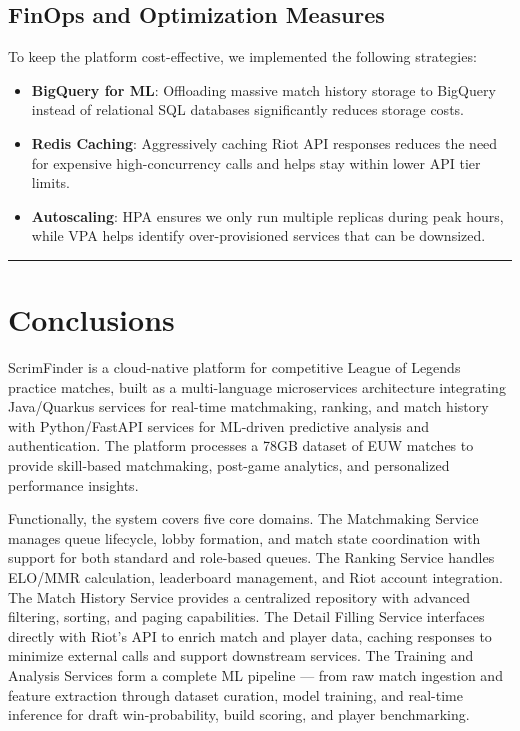 \documentclass[11pt,a4paper]{article}
\newcommand{\bff}[1]{\textbf{#1}}
\begin{document}
 \subsection{FinOps and Optimization Measures}
 To keep the platform cost-effective, we implemented the following strategies:
 \begin{itemize}
  \item \bff{BigQuery for ML}: Offloading massive match history storage to BigQuery instead of relational SQL databases significantly reduces storage costs.
  \item \bff{Redis Caching}: Aggressively caching Riot API responses reduces the need for expensive high-concurrency calls and helps stay within lower API tier limits.
  \item \bff{Autoscaling}: HPA ensures we only run multiple replicas during peak hours, while VPA helps identify over-provisioned services that can be downsized.
 \end{itemize}

 \vspace{1cm}
 \hrule
 \vspace{1cm}

 \section{Conclusions}

 ScrimFinder is a cloud-native platform for competitive League of Legends practice matches, built as a multi-language microservices architecture integrating Java/Quarkus services for real-time matchmaking, ranking, and match history with Python/FastAPI services for ML-driven predictive analysis and authentication. The platform processes a 78GB dataset of EUW matches to provide skill-based matchmaking, post-game analytics, and personalized performance insights.

 Functionally, the system covers five core domains. The Matchmaking Service manages queue lifecycle, lobby formation, and match state coordination with support for both standard and role-based queues. The Ranking Service handles ELO/MMR calculation, leaderboard management, and Riot account integration. The Match History Service provides a centralized repository with advanced filtering, sorting, and paging capabilities. The Detail Filling Service interfaces directly with Riot's API to enrich match and player data, caching responses to minimize external calls and support downstream services. The Training and Analysis Services form a complete ML pipeline --- from raw match ingestion and feature extraction through dataset curation, model training, and real-time inference for draft win-probability, build scoring, and player benchmarking. 
 
\end{document}
